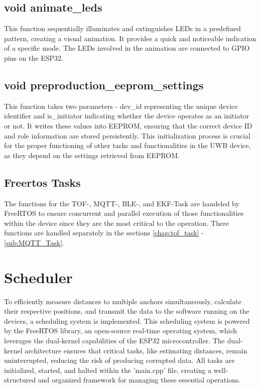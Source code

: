 \subsection{void animate\_leds}
\label{subsec:animate_leds}
This function sequentially illuminates and extinguishes LEDs in a predefined pattern, creating a visual animation. 
It provides a quick and noticeable indication of a specific mode. 
The LEDs involved in the animation are connected to GPIO pins on the ESP32. 

\subsection{void preproduction\_eeprom\_settings}
\label{subsec:preproduction_eeprom_settings}
This function takes two parameters - dev\_id representing the unique device identifier and is\_initiator indicating whether the device operates as an initiator or not. 
It writes these values into EEPROM, ensuring that the correct device ID and role information are stored persistently. This initialization process is crucial for the proper functioning of other tasks and functionalities in the UWB device, as they depend on the settings retrieved from EEPROM.

\subsection{Freertos Tasks}
\label{subsec:Freertos_Tasks}
The functions for the TOF-, MQTT-, BLE-, and EKF-Task are handeled by FreeRTOS to ensure concurrent and parallel execution of those functionalities within the device since they are the most critical to the operation. 
There functions are handled separately in the sections \ref{chap:tof_task} - \ref{sub:MQTT_Task}. 

\section{Scheduler}
\label{sec:Scheduler}
To efficiently measure distances to multiple anchors simultaneously, calculate their respective positions, and transmit the data to the software running on the devices, a scheduling system is implemented. 
This scheduling system is powered by the FreeRTOS library, an open-source real-time operating system, which leverages the dual-kernel capabilities of the ESP32 microcontroller.
\vspace{4pt}
\newline
The dual-kernel architecture ensures that critical tasks, like estimating distances, remain uninterrupted, reducing the risk of producing corrupted data. 
All tasks are initialized, started, and halted within the 'main.cpp' file, creating a well-structured and organized framework for managing these essential operations.

